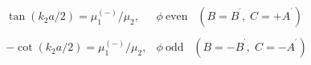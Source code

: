 \begin{equation}
\begin{array}{cc}
&  \\
\tan \left( k_{2}a/2\right) =\mu _{1}^{\left( -\right) }/\mu _{2}, & \phi \
\textrm{even}\;\;\;(B=B^{^{\prime }},\;C=+A^{^{\prime }}) \\
&  \\
-\cot \left( k_{2}a/2\right) =\mu _{1}^{\left( -\right) }/\mu _{2}, & \phi \
\textrm{odd}\;\;\;(B=-B^{^{\prime }},\;C=-A^{^{\prime }})
\end{array}
\label{eq70}
\end{equation}

